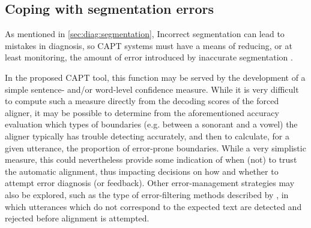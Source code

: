 
	\subsection{Coping with segmentation errors}

	\TODO{}
	
		
	
	As mentioned in \cref{sec:diag:segmentation}, 
	Incorrect segmentation can lead to mistakes in diagnosis, so CAPT systems must have a means of reducing, or at least monitoring, the amount of error introduced by inaccurate segmentation \citep{Eskenazi2009}. 
	
	In the proposed CAPT tool, this function may be served by the development of a simple sentence- and/or word-level confidence measure. 
	While it is very difficult to compute such a measure directly from the decoding scores of the forced aligner, it may be possible to determine from the aforementioned accuracy evaluation which types of boundaries (e.g. between a sonorant and a vowel) the aligner typically has trouble detecting accurately, and then to calculate, for a given utterance, the proportion of error-prone boundaries. While a very simplistic measure, this could nevertheless provide some indication of when (not) to trust the automatic alignment, thus impacting decisions on how and whether to attempt error diagnosis (or feedback).
	Other error-management strategies may also be explored, such as the type of error-filtering methods described by \textcite{Mesbahi2011,Bonneau2012,Orosanu2012}, in which utterances which do not correspond to the expected text are detected and rejected before alignment is attempted.
	
	
	
	
	\subsection{}
	
